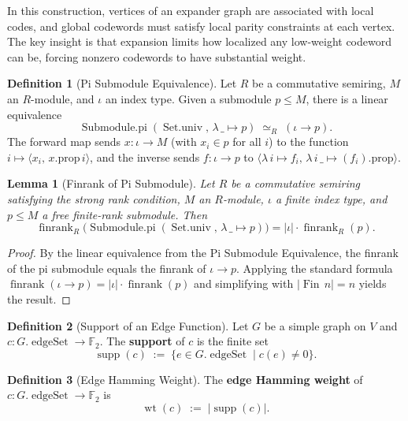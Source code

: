 \documentclass[11pt]{article}
\theoremstyle{plain}
\newtheorem*{lemma}{Lemma}
\theoremstyle{definition}
\newtheorem*{definition}{Definition}
\theoremstyle{remark}
\begin{document}
In this construction, vertices of an expander graph are associated with local codes, and global codewords must satisfy local parity constraints at each vertex. The key insight is that expansion limits how localized any low-weight codeword can be, forcing nonzero codewords to have substantial weight.

\begin{definition}[Pi Submodule Equivalence]
Let $R$ be a commutative semiring, $M$ an $R$-module, and $\iota$ an index type. Given a submodule $p \leq M$, there is a linear equivalence
\[
\operatorname{Submodule.pi}(\operatorname{Set.univ},\, \lambda\,\_\mapsto p) \;\simeq_R\; (\iota \to p).
\]
The forward map sends $x : \iota \to M$ (with $x_i \in p$ for all $i$) to the function $i \mapsto \langle x_i,\, x.\text{prop}\, i\rangle$, and the inverse sends $f : \iota \to p$ to $\langle \lambda\,i \mapsto f_i,\, \lambda\,i\,\_ \mapsto (f_i).\text{prop}\rangle$.
\end{definition}

\begin{lemma}[Finrank of Pi Submodule]
Let $R$ be a commutative semiring satisfying the strong rank condition, $M$ an $R$-module, $\iota$ a finite index type, and $p \leq M$ a free finite-rank submodule. Then
\[
\operatorname{finrank}_R\bigl(\operatorname{Submodule.pi}(\operatorname{Set.univ},\, \lambda\,\_\mapsto p)\bigr) = |\iota| \cdot \operatorname{finrank}_R(p).
\]
\end{lemma}

\begin{proof}
By the linear equivalence from the Pi Submodule Equivalence, the finrank of the pi submodule equals the finrank of $\iota \to p$. Applying the standard formula $\operatorname{finrank}(\iota \to p) = |\iota| \cdot \operatorname{finrank}(p)$ and simplifying with $|\operatorname{Fin}\,n| = n$ yields the result.
\end{proof}

\begin{definition}[Support of an Edge Function]
Let $G$ be a simple graph on $V$ and $c : G.\operatorname{edgeSet} \to \mathbb{F}_2$. The \textbf{support} of $c$ is the finite set
\[
\operatorname{supp}(c) \;:=\; \{e \in G.\operatorname{edgeSet} \mid c(e) \neq 0\}.
\]
\end{definition}

\begin{definition}[Edge Hamming Weight]
The \textbf{edge Hamming weight} of $c : G.\operatorname{edgeSet} \to \mathbb{F}_2$ is
\[
\operatorname{wt}(c) \;:=\; |\operatorname{supp}(c)|.
\]
\end{definition}
\end{document}
